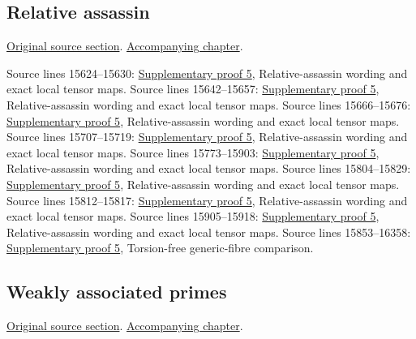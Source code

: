 \subsection{Relative assassin}
\hypertarget{algebra-source-section-relative-assassin}{}
\noindent\href{https://github.com/stacks/stacks-project/blob/a04446e57ec1fbc252a871afcec7752fb2807b14/algebra.tex\#L15616}{Original source section}. \href{algebra.pdf\#nameddest=section-relative-assassin}{Accompanying chapter}.

\begin{AlgebraSourceRoutes}
 Source lines 15624--15630: \hyperlink{algebra_symbolic_weakass_notes_20260927}{Supplementary proof 5}, Relative-assassin wording and exact local tensor maps.
 Source lines 15642--15657: \hyperlink{algebra_symbolic_weakass_notes_20260927}{Supplementary proof 5}, Relative-assassin wording and exact local tensor maps.
 Source lines 15666--15676: \hyperlink{algebra_symbolic_weakass_notes_20260927}{Supplementary proof 5}, Relative-assassin wording and exact local tensor maps.
 Source lines 15707--15719: \hyperlink{algebra_symbolic_weakass_notes_20260927}{Supplementary proof 5}, Relative-assassin wording and exact local tensor maps.
 Source lines 15773--15903: \hyperlink{algebra_symbolic_weakass_notes_20260927}{Supplementary proof 5}, Relative-assassin wording and exact local tensor maps.
 Source lines 15804--15829: \hyperlink{algebra_symbolic_weakass_notes_20260927}{Supplementary proof 5}, Relative-assassin wording and exact local tensor maps.
 Source lines 15812--15817: \hyperlink{algebra_symbolic_weakass_notes_20260927}{Supplementary proof 5}, Relative-assassin wording and exact local tensor maps.
 Source lines 15905--15918: \hyperlink{algebra_symbolic_weakass_notes_20260927}{Supplementary proof 5}, Relative-assassin wording and exact local tensor maps.
 Source lines 15853--16358: \hyperlink{algebra_symbolic_weakass_notes_20260927}{Supplementary proof 5}, Torsion-free generic-fibre comparison.
\end{AlgebraSourceRoutes}

\subsection{Weakly associated primes}
\hypertarget{algebra-source-section-weakly-ass}{}
\noindent\href{https://github.com/stacks/stacks-project/blob/a04446e57ec1fbc252a871afcec7752fb2807b14/algebra.tex\#L15925}{Original source section}. \href{algebra.pdf\#nameddest=section-weakly-ass}{Accompanying chapter}.

